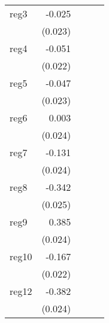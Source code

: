 {\begin{longtable}{l*{4}{D{.}{.}{-1}}}
\addlinespace
reg3        &      -0.025         &                     &                     &                     \\
            &     (0.023)         &                     &                     &                     \\
\addlinespace
reg4        &      -0.051\sym{*}  &                     &                     &                     \\
            &     (0.022)         &                     &                     &                     \\
\addlinespace
reg5        &      -0.047\sym{*}  &                     &                     &                     \\
            &     (0.023)         &                     &                     &                     \\
\addlinespace
reg6        &       0.003         &                     &                     &                     \\
            &     (0.024)         &                     &                     &                     \\
\addlinespace
reg7        &      -0.131\sym{***}&                     &                     &                     \\
            &     (0.024)         &                     &                     &                     \\
\addlinespace
reg8        &      -0.342\sym{***}&                     &                     &                     \\
            &     (0.025)         &                     &                     &                     \\
\addlinespace
reg9        &       0.385\sym{***}&                     &                     &                     \\
            &     (0.024)         &                     &                     &                     \\
\addlinespace
reg10       &      -0.167\sym{***}&                     &                     &                     \\
            &     (0.022)         &                     &                     &                     \\
\addlinespace
reg12       &      -0.382\sym{***}&                     &                     &                     \\
            &     (0.024)         &                     &                     &                     \\

\end{longtable}}

